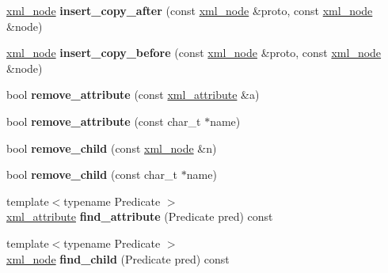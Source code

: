 \begin{DoxyCompactItemize}
\item 
\hypertarget{classpugi_1_1xml__node_a106a600eac7d08608f797d034b331fa8}{\hyperlink{classpugi_1_1xml__node}{xml\-\_\-node} {\bfseries insert\-\_\-copy\-\_\-after} (const \hyperlink{classpugi_1_1xml__node}{xml\-\_\-node} \&proto, const \hyperlink{classpugi_1_1xml__node}{xml\-\_\-node} \&node)}\label{classpugi_1_1xml__node_a106a600eac7d08608f797d034b331fa8}

\item 
\hypertarget{classpugi_1_1xml__node_a21134448747e00888df7ecfb174032d3}{\hyperlink{classpugi_1_1xml__node}{xml\-\_\-node} {\bfseries insert\-\_\-copy\-\_\-before} (const \hyperlink{classpugi_1_1xml__node}{xml\-\_\-node} \&proto, const \hyperlink{classpugi_1_1xml__node}{xml\-\_\-node} \&node)}\label{classpugi_1_1xml__node_a21134448747e00888df7ecfb174032d3}

\item 
\hypertarget{classpugi_1_1xml__node_aee02f0e2dab4aaeb6196f26b3bcf258c}{bool {\bfseries remove\-\_\-attribute} (const \hyperlink{classpugi_1_1xml__attribute}{xml\-\_\-attribute} \&a)}\label{classpugi_1_1xml__node_aee02f0e2dab4aaeb6196f26b3bcf258c}

\item 
\hypertarget{classpugi_1_1xml__node_a2625858b335a1289d72d19b57acc639c}{bool {\bfseries remove\-\_\-attribute} (const char\-\_\-t $\ast$name)}\label{classpugi_1_1xml__node_a2625858b335a1289d72d19b57acc639c}

\item 
\hypertarget{classpugi_1_1xml__node_a4b562d01edab7dad880e9e297203843d}{bool {\bfseries remove\-\_\-child} (const \hyperlink{classpugi_1_1xml__node}{xml\-\_\-node} \&n)}\label{classpugi_1_1xml__node_a4b562d01edab7dad880e9e297203843d}

\item 
\hypertarget{classpugi_1_1xml__node_a1930157197e41cc15eea1fc00eecf1dd}{bool {\bfseries remove\-\_\-child} (const char\-\_\-t $\ast$name)}\label{classpugi_1_1xml__node_a1930157197e41cc15eea1fc00eecf1dd}

\item 
\hypertarget{classpugi_1_1xml__node_a4e0125eb6c0857df370119df923096ea}{{\footnotesize template$<$typename Predicate $>$ }\\\hyperlink{classpugi_1_1xml__attribute}{xml\-\_\-attribute} {\bfseries find\-\_\-attribute} (Predicate pred) const }\label{classpugi_1_1xml__node_a4e0125eb6c0857df370119df923096ea}

\item 
\hypertarget{classpugi_1_1xml__node_a25b60f2847c1937f0d4dbd4828bdcd7d}{{\footnotesize template$<$typename Predicate $>$ }\\\hyperlink{classpugi_1_1xml__node}{xml\-\_\-node} {\bfseries find\-\_\-child} (Predicate pred) const }\label{classpugi_1_1xml__node_a25b60f2847c1937f0d4dbd4828bdcd7d}


\end{DoxyCompactItemize}
